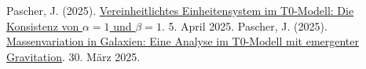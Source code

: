 \documentclass[12pt,a4paper]{article}
\theoremstyle{definition}
\theoremstyle{remark}
\begin{document}
	\begin{thebibliography}{9}
		 Pascher, J. (2025). \href{https://github.com/jpascher/T0-Time-Mass-Duality/tree/main/2/pdf/Deutsch/Alpha1Beta1Konsistenz.pdf}{Vereinheitlichtes Einheitensystem im T0-Modell: Die Konsistenz von \(\alpha = 1\) und \(\beta = 1\)}. 5. April 2025.
		 Pascher, J. (2025). \href{https://github.com/jpascher/T0-Time-Mass-Duality/tree/main/2/pdf/Deutsch/MassVarGalaxien.pdf}{Massenvariation in Galaxien: Eine Analyse im T0-Modell mit emergenter Gravitation}. 30. März 2025.
	\end{thebibliography}
	
\end{document}
